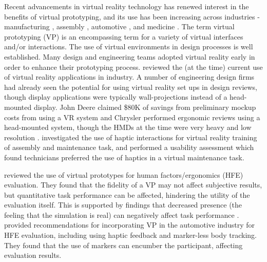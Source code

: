 Recent advancements in virtual reality technology has renewed interest in the benefits of virtual prototyping, and its use has been increasing across industries - manufacturing \citep{choi_virtual_2015}, assembly \citep{pontonnier_designing_2014}, automotive \citep{bordegoni_mixed_2012,lawson_future_2016}, and medicine \citep{nagendran_virtual_2013}.
The term virtual prototyping (VP) is an encompassing term for a variety of virtual interfaces and/or interactions.
The use of virtual environments in design processes is well established.
Many design and engineering teams adopted virtual reality early in order to enhance their prototyping process.
\citet{brooks_jr_whats_1999} reviewed the (at the time) current use of virtual reality applications in industry.
A number of engineering design firms had already seen the potential for using virtual reality set ups in design reviews, though display applications were typically wall-projections instead of a head-mounted display.
John Deere claimed \$80K of savings from preliminary mockup costs from using a VR system and Chrysler performed ergonomic reviews using a head-mounted system, though the HMDs at the time were very heavy and low resolution \citep{brooks_jr_whats_1999}.
\citet{abate_haptic-based_2009} investigated the use of haptic interactions for virtual reality training of assembly and maintenance task, and performed a usability assessment which found technicians preferred the use of haptics in a virtual maintenance task.

\citet{aromaa_suitability_2016} reviewed the use of virtual prototypes for human factors/ergonomics (HFE) evaluation.
They found that the fidelity of a VP may not affect subjective results, but quantitative task performance can be affected, hindering the utility of the evaluation itself.
This is supported by findings that decreased presence (the feeling that the simulation is real) can negatively affect task performance \citep{youngblut_relationship_2003}.
\citet{lawson_future_2016} provided recommendations for incorporating VP in the automotive industry for HFE evaluation, including using haptic feedback and marker-less body tracking.
They found that the use of markers can encumber the participant, affecting evaluation results.

